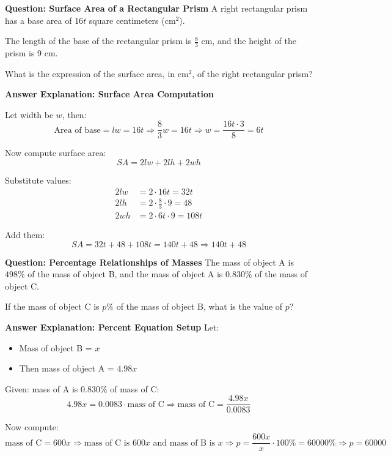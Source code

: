 \documentclass{beamer}
\begin{document}
\begin{frame}{\textbf{Question: Surface Area of a Rectangular Prism}}
\small
A right rectangular prism has a base area of $16t$ square centimeters ($\text{cm}^2$).

The length of the base of the rectangular prism is $\frac{8}{3}$ cm, and the height of the prism is 9 cm.

What is the expression of the surface area, in $\text{cm}^2$, of the right rectangular prism?
\end{frame}



\begin{frame}{\textbf{Answer Explanation: Surface Area Computation}}
\small


Let width be $w$, then:
\[
\text{Area of base} = lw = 16t \Rightarrow \frac{8}{3}w = 16t \Rightarrow w = \frac{16t \cdot 3}{8} = 6t
\]

Now compute surface area:
\[
SA = 2lw + 2lh + 2wh
\]

Substitute values:
\[
\begin{aligned}
2lw &= 2 \cdot 16t = 32t \\
2lh &= 2 \cdot \frac{8}{3} \cdot 9 = 48 \\
2wh &= 2 \cdot 6t \cdot 9 = 108t
\end{aligned}
\]

Add them:
\[
SA = 32t + 48 + 108t = 140t + 48
\Rightarrow \boxed{140t + 48}
\]
\end{frame}





\begin{frame}{\textbf{Question: Percentage Relationships of Masses}}
\small
The mass of object A is $498\%$ of the mass of object B, and the mass of object A is $0.830\%$ of the mass of object C.

If the mass of object C is $p\%$ of the mass of object B, what is the value of $p$?
\end{frame}
\begin{frame}{\textbf{Answer Explanation: Percent Equation Setup}}
\small
Let:
\begin{itemize}
    \item Mass of object B = $x$
    \item Then mass of object A = $4.98x$
\end{itemize}

Given: mass of A is $0.830\%$ of mass of C:
\[
4.98x = 0.0083 \cdot \text{mass of C}
\Rightarrow \text{mass of C} = \frac{4.98x}{0.0083}
\]

Now compute:
\[
\text{mass of C} = 600x
\Rightarrow \text{mass of C is } 600x \text{ and mass of B is } x

\Rightarrow p = \frac{600x}{x} \cdot 100\% = 60000\%
\Rightarrow \boxed{p = 60000}
\]

\end{frame}
\end{document}
